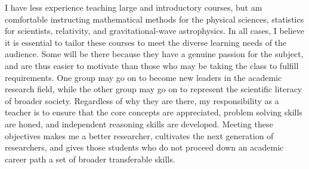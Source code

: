 \documentclass[11pt,letterpaper,sans]{moderncv} %
\begin{document}
I have less experience teaching large and introductory courses, but am comfortable instructing mathematical methods for the physical sciences, statistics for scientists, relativity, and gravitational-wave astrophysics. In all cases, I believe it is essential to tailor these courses to meet the diverse learning needs of the audience. Some will be there because they have a genuine passion for the subject, and are thus easier to motivate than those who may be taking the class to fulfill requirements. One group may go on to become new leaders in the academic research field, while the other group may go on to represent the scientific literacy of broader society. Regardless of why they are there, my responsibility as a teacher is to ensure that the core concepts are appreciated, problem solving skills are honed, and independent reasoning skills are developed. Meeting these objectives makes me a better researcher, cultivates the next generation of researchers, and gives those students who do not proceed down an academic career path a set of broader transferable skills.
\end{document}
